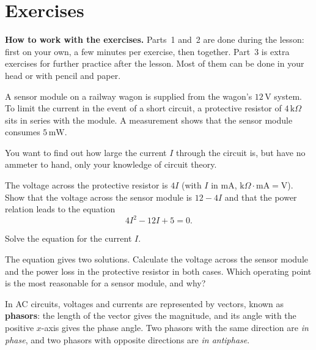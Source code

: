 
\section{Exercises}
\label{c7:sec:uppgifter}

\begin{aside}
\textbf{How to work with the exercises.} Parts~1 and~2 are done during the lesson: first on your
own, a few minutes per exercise, then together. Part~3 is extra exercises for further practice
after the lesson. Most of them can be done in your head or with pencil and paper.

\end{aside}


A sensor module on a railway wagon is supplied from the wagon's $12\,\text{V}$ system. To limit
the current in the event of a short circuit, a protective resistor of $4\,\text{k}\Omega$ sits in
series with the module. A measurement shows that the sensor module consumes $5\,\text{mW}$.


You want to find out how large the current $I$ through the circuit is, but have no ammeter to
hand, only your knowledge of circuit theory.
\begin{parts}
  \item The voltage across the protective resistor is $4I$ (with $I$ in mA,
    $\text{k}\Omega \cdot \text{mA} = \text{V}$). Show that the voltage across the sensor module
    is $12 - 4I$ and that the power relation leads to the equation
    \[
      4I^2 - 12I + 5 = 0.
    \]
  \item Solve the equation for the current $I$.
  \item The equation gives two solutions. Calculate the voltage across the sensor module and the
    power loss in the protective resistor in both cases. Which operating point is the most
    reasonable for a sensor module, and why?
\end{parts}

In AC circuits, voltages and currents are represented by vectors, known as \textbf{phasors}: the
length of the vector gives the magnitude, and its angle with the positive $x$-axis gives the phase
angle. Two phasors with the same direction are \emph{in phase}, and two phasors with opposite
directions are \emph{in antiphase}.


